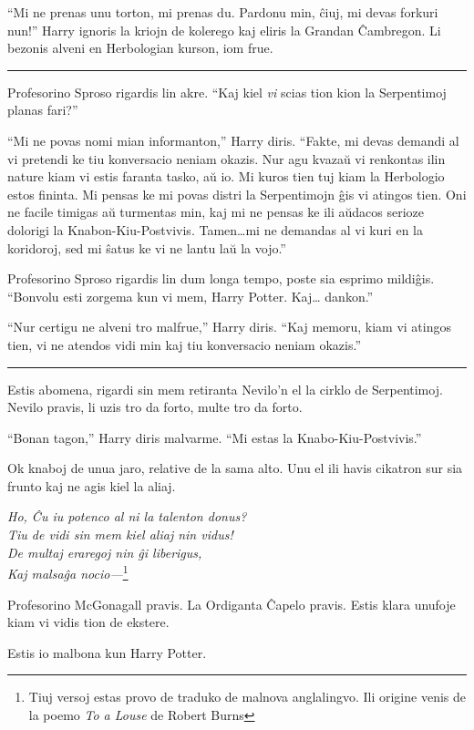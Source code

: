 ``Mi ne prenas unu torton, mi prenas du. Pardonu min, ĉiuj, mi devas forkuri
nun!'' Harry ignoris la kriojn de kolerego kaj eliris la Grandan
Ĉambregon. Li bezonis alveni en Herbologian kurson, iom frue.

\begin{center}\rule{3in}{0.4pt}\end{center}

Profesorino Sproso rigardis lin akre. ``Kaj kiel \emph{vi} scias tion
kion la Serpentimoj planas fari?''

``Mi ne povas nomi mian informanton,'' Harry diris. ``Fakte, mi devas
demandi al vi pretendi ke tiu konversacio neniam okazis. Nur agu
kvazaŭ vi renkontas ilin nature kiam vi estis faranta tasko, aŭ io. Mi
kuros tien tuj kiam la Herbologio estos fininta. Mi pensas ke mi povas distri
la Serpentimojn ĝis vi atingos tien. Oni ne facile timigas aŭ
turmentas min, kaj mi ne pensas ke ili aŭdacos serioze dolorigi la
Knabon-Kiu-Postvivis. Tamen\ldots mi ne demandas al vi kuri en la
koridoroj, sed mi ŝatus ke vi ne lantu laŭ la vojo.''

Profesorino Sproso rigardis lin dum longa tempo, poste sia esprimo
mildiĝis. ``Bonvolu esti zorgema kun vi mem, Harry Potter. Kaj\ldots
dankon.''

``Nur certigu ne alveni tro malfrue,'' Harry diris. ``Kaj memoru, kiam
vi atingos tien, vi ne atendos vidi min kaj tiu konversacio neniam
okazis.''

\begin{center}\rule{3in}{0.4pt}\end{center}

Estis abomena, rigardi sin mem retiranta Nevilo'n el la cirklo de
Serpentimoj. Nevilo pravis, li uzis tro da forto, multe tro da forto.

``Bonan tagon,'' Harry diris malvarme. ``Mi estas la Knabo-Kiu-Postvivis.''

Ok knaboj de unua jaro, relative de la sama alto. Unu el ili havis
cikatron sur sia frunto kaj ne agis kiel la aliaj.

\begin{center}
  \emph{Ho, Ĉu iu potenco al ni la talenton donus?\\
    Tiu de vidi sin mem kiel aliaj nin vidus! \\
    De multaj eraregoj nin ĝi liberigus, \\
    Kaj malsaĝa nocio—}\footnote{Tiuj versoj estas provo de traduko de malnova
    anglalingvo. Ili origine venis de la poemo \emph{To a Louse} de Robert
    Burns}
\end{center}  


Profesorino McGonagall pravis. La Ordiganta Ĉapelo pravis. Estis klara unufoje kiam vi vidis tion de ekstere.

Estis io malbona kun Harry Potter.











